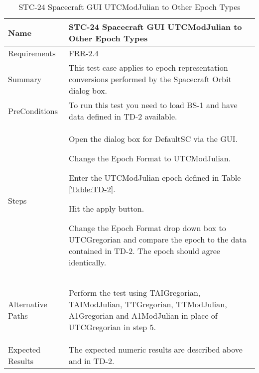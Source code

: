 \begin{table}[htbp!]
\centering
      \begin{tabular}{|p{1.05 in} |p{4.75 in} |}
      \hline
         \rowcolor[rgb]{0.8,0.8,0.8} Name & STC-24 Spacecraft GUI UTCModJulian to Other Epoch Types\\
         \hline
         Requirements & FRR-2.4\\ \hline
         Summary &
         This test case applies to epoch representation conversions performed by the Spacecraft Orbit dialog box.  \\
         \hline
         PreConditions & To run this test you need to load BS-1 and have data defined in TD-2 available.\\
         \hline
         Steps &
         \begin{compactenum}
         \item Open the dialog box for DefaultSC via the GUI.
         \item Change the Epoch Format to UTCModJulian.
         \item Enter the UTCModJulian epoch defined in Table \ref{Table:TD-2}.
         \item Hit the apply button.
         \item Change the Epoch Format drop down box to UTCGregorian and compare the epoch to the
          data contained in TD-2. The epoch should agree identically.
         \end{compactenum}\\
		 \hline
         Alternative Paths &
         \begin{compactenum}
         \item Perform the test using TAIGregorian, TAIModJulian, TTGregorian, TTModJulian, A1Gregorian
         and A1ModJulian in place of UTCGregorian in step 5.
         \end{compactenum}\\
         \hline
         Expected Results & The expected numeric results are described above and in TD-2.\\
      \hline
\end{tabular}
      \label{Table:STC-24}
      \caption{STC-24 Spacecraft GUI UTCModJulian to Other Epoch Types}
\end{table} 
